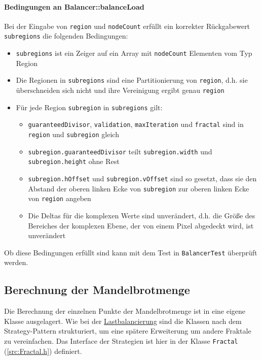 \paragraph*{Bedingungen an Balancer::balanceLoad}
Bei der Eingabe von \verb|region| und \verb|nodeCount| erfüllt ein korrekter Rückgabewert \verb|subregions| die folgenden Bedingungen:
\begin{itemize}
	\item \verb|subregions| ist ein Zeiger auf ein Array mit \verb|nodeCount| Elementen vom Typ Region
	\item Die Regionen in \verb|subregions| sind eine Partitionierung von \verb|region|, d.h. sie überschneiden sich nicht und ihre Vereinigung ergibt genau \verb|region|
	\item Für jede Region \verb|subregion| in \verb|subregions| gilt:
	\begin{itemize}
		\item \verb|guaranteedDivisor|, \verb|validation|, \verb|maxIteration| und \verb|fractal| sind in \verb|region| und \verb|subregion| gleich
		\item \verb|subregion.guaranteedDivisor| teilt \verb|subregion.width| und \\ \verb|subregion.height| ohne Rest
		\item \verb|subregion.hOffset| und \verb|subregion.vOffset| sind so gesetzt, dass sie den Abstand der oberen linken Ecke von \verb|subregion| zur oberen linken Ecke von \verb|region| angeben
		\item Die Deltas für die komplexen Werte sind unverändert, d.h. die Größe des Bereiches der komplexen Ebene, der von einem Pixel abgedeckt wird, ist unverändert
	\end{itemize}
\end{itemize}

Ob diese Bedingungen erfüllt sind kann mit dem Test in \verb|BalancerTest| überprüft werden.

\subsection{Berechnung der Mandelbrotmenge}

Die Berechnung der einzelnen Punkte der Mandelbrotmenge ist in eine eigene Klasse ausgelagert.
Wie bei der \hyperref[sec:load_balancing]{Lastbalancierung} sind die Klassen nach dem Strategy-Pattern strukturiert, um eine spätere Erweiterung um andere Fraktale zu vereinfachen.
Das Interface der Strategien ist hier in der Klasse \verb|Fractal| (\autoref{src:Fractal.h}) definiert.

